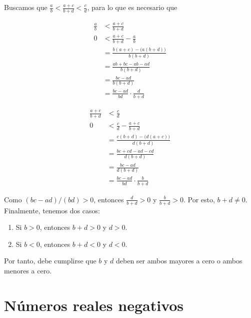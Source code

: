 \documentclass[11pt]{article}
\newcommand{\R}{\mathbb{R}}
\newcommand{\bfit}[1]{\textbf{\textit{#1}}}
\let\set\Set
\begin{document}
\begin{enumerate}[label=\alph*)]
    Buscamos que $\frac{a}{b}<\frac{a+c}{b+d}<\frac{c}{d}$, para lo que es necesario que
    \begin{center}%
    \begin{minipage}[l]{.5\linewidth}
    \begin{align*}
        \frac{a}{b} &< \frac{a+c}{b+d}\\
        0 &< \frac{a+c}{b+d} - \frac{a}{b}\\
        &= \frac{b(a+c)-\bigl(a(b+d)\bigr)}{b(b+d)}\\
        &= \frac{ab+bc-ab-ad}{b(b+d)}\\
        &= \frac{bc-ad}{b(b+d)}\\
        &= \frac{bc-ad}{bd} \cdot \frac{d}{b+d}
    \end{align*}
    \end{minipage}%
    \begin{minipage}[r]{.5\linewidth}
    \begin{align*}
        \frac{a+c}{b+d} &< \frac{c}{d}\\
        0 &< \frac{c}{d} -\frac{a+c}{b+d}\\
        &= \frac{c(b+d)-\bigl(d(a+c)\bigr)}{d(b+d)}\\
        &= \frac{bc+cd-ad-cd}{d(b+d)}\\
        &= \frac{bc-ad}{d(b+d)}\\
        &= \frac{bc-ad}{bd} \cdot \frac{b}{b+d}
    \end{align*}
    \end{minipage}
    \end{center}
    Como $(bc-ad)/(bd)>0$, entonces $\frac{d}{b+d}>0$ y $\frac{b}{b+d}>0$. Por esto, $b+d\neq 0$. Finalmente, tenemos dos casos: \begin{enumerate}[label=\roman*)]
        \item Si $b>0$, entonces $b+d>0$ y $d>0$.
        \item Si $b<0$, entonces $b+d<0$ y $d<0$.
    \end{enumerate}

    Por tanto, debe cumplirse que $b$ y $d$ deben ser ambos mayores a cero o ambos menores a cero.

\end{enumerate}

\pagebreak

\section*{Números reales negativos}
\end{document}
